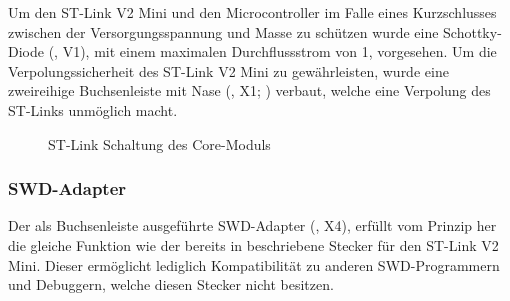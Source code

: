 Um den ST-Link V2 Mini und den Microcontroller im Falle eines Kurzschlusses zwischen der Versorgungsspannung und Masse zu schützen wurde eine Schottky-Diode (, V1), mit einem maximalen Durchflussstrom von \unit{1}{\ampere}, vorgesehen. Um die Verpolungssicherheit des ST-Link V2 Mini zu gewährleisten, wurde eine zweireihige Buchsenleiste mit Nase (, X1; ) verbaut, welche eine Verpolung des ST-Links unmöglich macht.


\begin{figure}[htb]
    \centering
    \qquad
{}\qquad
    \caption[ST-Link Schaltung des Core-Moduls]{ST-Link Schaltung des \gls{Core-Modul}s}
    \label{fig:coremodul-swd}
\end{figure}


\subsubsection{SWD-Adapter}
Der als Buchsenleiste ausgeführte SWD-Adapter (, X4), erfüllt vom Prinzip her die gleiche Funktion wie der bereits in  beschriebene Stecker für den ST-Link V2 Mini. Dieser ermöglicht lediglich Kompatibilität zu anderen SWD-Programmern und Debuggern, welche diesen Stecker nicht besitzen.

